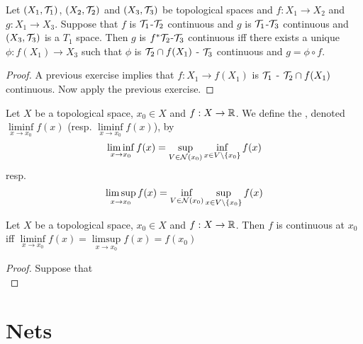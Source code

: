 \documentclass{book}
\begin{document}
	\begin{ex} \lex{}
	Let $(X_1, \mathcal{T}_1)$, $(X_2, \mathcal{T}_2)$ and $(X_3, \mathcal{T}_3)$ be topological spaces and $f: X_1 \rightarrow X_2$ and $g:X_1 \rightarrow X_3$. Suppose that $f$ is $\mathcal{T}_1$-$\mathcal{T}_2$ continuous and $g$ is $\mathcal{T}_1$-$\mathcal{T}_3$ continuous and $(X_3, \mathcal{T}_3)$ is a $T_1$ space. Then $g$ is $f^*\mathcal{T}_2$-$\mathcal{T}_3$ continuous iff there exists a unique $\phi: f(X_1) \rightarrow X_3$ such that $\phi$ is $\mathcal{T}_2 \cap f(X_1)$ - $\mathcal{T}_3$ continuous and $g = \phi \circ f$. \\
	\end{ex}
	
	\begin{proof}
	A previous exercise implies that $f: X_1 \rightarrow f(X_1)$ is $\mathcal{T}_1$ - $\mathcal{T}_2 \cap f(X_1)$ continuous. Now apply the previous exercise. 
	\end{proof}
	
	\begin{defn}
		Let $X$ be a topological space, $x_0 \in X$ and $f:X \rightarrow \mathbb{R}$. We define the , denoted $\liminf\limits_{x \rightarrow x_0}f(x)$ (resp. $\liminf\limits_{x \rightarrow x_0}f(x)$), by 
		$$\liminf_{x \rightarrow x_0} f(x) = \sup_{V \in \mathcal{N}(x_0)} \inf_{x \in V \setminus \{x_0\}} f(x)$$
		resp. 
		$$\limsup_{x \rightarrow x_0} f(x) = \inf_{V \in \mathcal{N}(x_0)} \sup_{x \in V \setminus \{x_0\}} f(x)$$
	\end{defn}

	\begin{ex}
		Let $X$ be a topological space, $x_0 \in X$ and $f:X \rightarrow \mathbb{R}$. Then $f$ is continuous at $x_0$ iff $\liminf\limits_{x \rightarrow x_0}f(x) = \limsup\limits_{x \rightarrow x_0}f(x) = f(x_0)$ 
	\end{ex}

	\begin{proof}
		Suppose that \\
	\end{proof}














\newpage
\section{Nets}	
\end{document}
